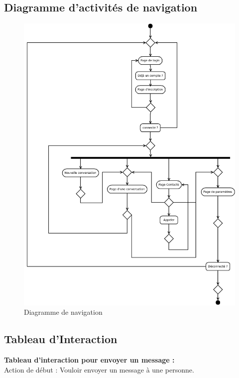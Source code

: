 \documentclass[a4paper,12pt]{article}
\begin{document}
	\subsection{Diagramme d'activités de navigation}
	\begin{figure}[H]
		\centerline{\includegraphics[width=16.5cm]{../diagrammes/img/navigation.png}}
		\caption{Diagramme de navigation}
	\end{figure}


	\subsection{Tableau d’Interaction}

	\textbf{Tableau d’interaction pour envoyer un message :} \\

	Action de début : Vouloir envoyer un message à une personne. \\
\end{document}
